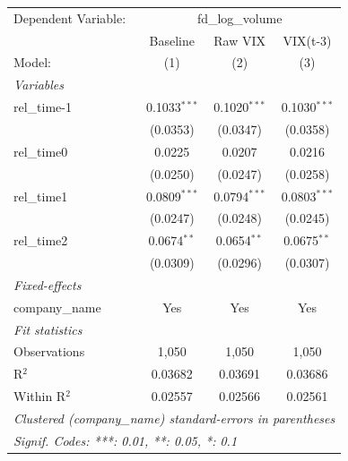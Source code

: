 
\begingroup
\centering
\begin{tabular}{lccc}
   \tabularnewline \midrule \midrule
   Dependent Variable: & \multicolumn{3}{c}{fd\_log\_volume}\\
                  & Baseline       & Raw VIX        & VIX(t-3) \\   
   Model:         & (1)            & (2)            & (3)\\  
   \midrule
   \emph{Variables}\\
   rel\_time-1    & 0.1033$^{***}$ & 0.1020$^{***}$ & 0.1030$^{***}$\\   
                  & (0.0353)       & (0.0347)       & (0.0358)\\   
   rel\_time0     & 0.0225         & 0.0207         & 0.0216\\   
                  & (0.0250)       & (0.0247)       & (0.0258)\\   
   rel\_time1     & 0.0809$^{***}$ & 0.0794$^{***}$ & 0.0803$^{***}$\\   
                  & (0.0247)       & (0.0248)       & (0.0245)\\   
   rel\_time2     & 0.0674$^{**}$  & 0.0654$^{**}$  & 0.0675$^{**}$\\   
                  & (0.0309)       & (0.0296)       & (0.0307)\\   
   \midrule
   \emph{Fixed-effects}\\
   company\_name  & Yes            & Yes            & Yes\\  
   \midrule
   \emph{Fit statistics}\\
   Observations   & 1,050          & 1,050          & 1,050\\  
   R$^2$          & 0.03682        & 0.03691        & 0.03686\\  
   Within R$^2$   & 0.02557        & 0.02566        & 0.02561\\  
   \midrule \midrule
   \multicolumn{4}{l}{\emph{Clustered (company\_name) standard-errors in parentheses}}\\
   \multicolumn{4}{l}{\emph{Signif. Codes: ***: 0.01, **: 0.05, *: 0.1}}\\
\end{tabular}
\par\endgroup


